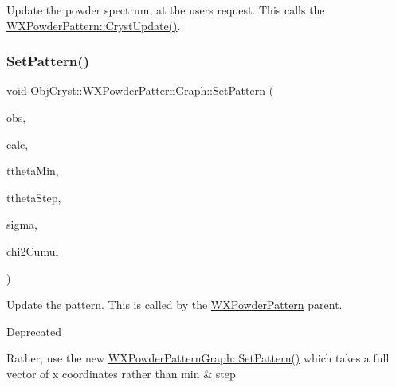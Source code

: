 Update the powder spectrum, at the user\textquotesingle{}s request. This calls the \mbox{\hyperlink{class_obj_cryst_1_1_w_x_powder_pattern_a8bdd59548c11c11a53197c0679c258a8}{W\+X\+Powder\+Pattern\+::\+Cryst\+Update()}}. \mbox{\label{class_obj_cryst_1_1_w_x_powder_pattern_graph_a6a35318893c5a0f03d2d05b0bab9f1a8}} 
\subsubsection{\texorpdfstring{SetPattern()}{SetPattern()}\hspace{0.1cm}{\footnotesize\ttfamily [1/2]}}
{\footnotesize\ttfamily void Obj\+Cryst\+::\+W\+X\+Powder\+Pattern\+Graph\+::\+Set\+Pattern (\begin{DoxyParamCaption}\item[{const Cryst\+Vector\+\_\+\+R\+E\+AL \&}]{obs,  }\item[{const Cryst\+Vector\+\_\+\+R\+E\+AL \&}]{calc,  }\item[{const R\+E\+AL}]{ttheta\+Min,  }\item[{const R\+E\+AL}]{ttheta\+Step,  }\item[{const Cryst\+Vector\+\_\+\+R\+E\+AL \&}]{sigma,  }\item[{const Cryst\+Vector\+\_\+\+R\+E\+AL \&}]{chi2\+Cumul }\end{DoxyParamCaption})}

Update the pattern. This is called by the \mbox{\hyperlink{class_obj_cryst_1_1_w_x_powder_pattern}{W\+X\+Powder\+Pattern}} parent.

\begin{DoxyRefDesc}{Deprecated}
\item[\mbox{\hyperlink{deprecated__deprecated000002}{Deprecated}}]Rather, use the new \mbox{\hyperlink{class_obj_cryst_1_1_w_x_powder_pattern_graph_a6a35318893c5a0f03d2d05b0bab9f1a8}{W\+X\+Powder\+Pattern\+Graph\+::\+Set\+Pattern()}} which takes a full vector of x coordinates rather than min \& step \end{DoxyRefDesc}
\mbox{\label{class_obj_cryst_1_1_w_x_powder_pattern_graph_af74825c7f7b2c132b9942a684b0311fe}} 
